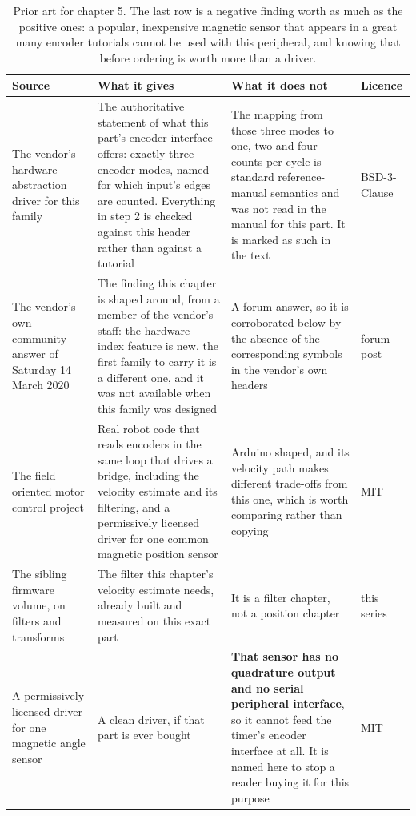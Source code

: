\begin{table}[H]\centering\small
\begin{tabular}{p{34mm}p{46mm}p{38mm}p{20mm}}
\toprule
Source & What it gives & What it does not & Licence \\
\midrule
The vendor's hardware abstraction driver for this family & The authoritative statement of what this part's encoder interface offers: exactly three encoder modes, named for which input's edges are counted. Everything in step 2 is checked against this header rather than against a tutorial & The mapping from those three modes to one, two and four counts per cycle is standard reference-manual semantics and was not read in the manual for this part. It is marked as such in the text & BSD-3-Clause \\
The vendor's own community answer of Saturday 14 March 2020 & The finding this chapter is shaped around, from a member of the vendor's staff: the hardware index feature is new, the first family to carry it is a different one, and it was not available when this family was designed & A forum answer, so it is corroborated below by the absence of the corresponding symbols in the vendor's own headers & forum post \\
The field oriented motor control project & Real robot code that reads encoders in the same loop that drives a bridge, including the velocity estimate and its filtering, and a permissively licensed driver for one common magnetic position sensor & Arduino shaped, and its velocity path makes different trade-offs from this one, which is worth comparing rather than copying & MIT \\
The sibling firmware volume, on filters and transforms & The filter this chapter's velocity estimate needs, already built and measured on this exact part & It is a filter chapter, not a position chapter & this series \\
A permissively licensed driver for one magnetic angle sensor & A clean driver, if that part is ever bought & \textbf{That sensor has no quadrature output and no serial peripheral interface}, so it cannot feed the timer's encoder interface at all. It is named here to stop a reader buying it for this purpose & MIT \\
\bottomrule
\end{tabular}
\caption{Prior art for chapter 5. The last row is a negative finding worth as much as the positive ones: a popular, inexpensive magnetic sensor that appears in a great many encoder tutorials cannot be used with this peripheral, and knowing that before ordering is worth more than a driver.}
\end{table}

